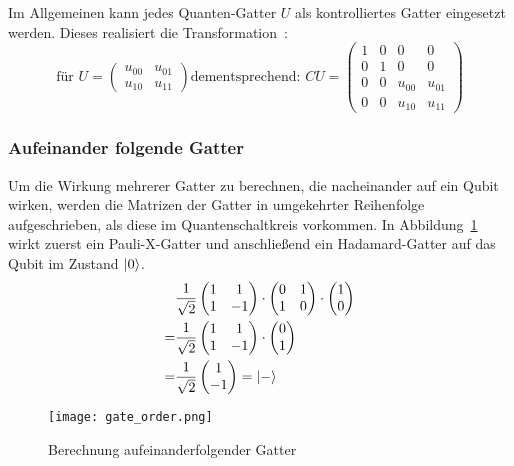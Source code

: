 Im Allgemeinen kann jedes Quanten-Gatter \(U\) als kontrolliertes Gatter eingesetzt werden. 
Dieses realisiert die Transformation~\cite{Hoever2023QC}: 
\[
  \text{für }
  U = 
  \begin{pmatrix}
    u_{00} & u_{01}\\
    u_{10} & u_{11}
    \end{pmatrix}
    \text{dementsprechend: }
    CU = 
  \begin{pmatrix}
    1 & 0 & 0 & 0\\
    0 & 1 & 0 & 0\\
    0 & 0 & u_{00} & u_{01}\\
    0 & 0 & u_{10} & u_{11}
    \end{pmatrix}
  \]


\subsubsection*{Aufeinander folgende Gatter} 

Um die Wirkung mehrerer Gatter zu berechnen, die nacheinander auf ein Qubit wirken, 
werden die Matrizen der Gatter in umgekehrter Reihenfolge aufgeschrieben, 
als diese im Quantenschaltkreis vorkommen. 
In Abbildung~\ref{fig:gate_order} wirkt zuerst ein Pauli-X-Gatter und anschließend ein Hadamard-Gatter auf das Qubit im Zustand \(\ket{0}\).
\begin{align*}
  &\frac{1}{\sqrt{2}}
  \begin{pmatrix}
    1 & 1 \\
    1 & -1
  \end{pmatrix} 
  \cdot
  \begin{pmatrix}
    0 & 1 \\
    1 & 0
    \end{pmatrix} 
  \cdot
  \begin{pmatrix}
    1  \\
    0 
  \end{pmatrix}  \\
  =&
  \frac{1}{\sqrt{2}}
  \begin{pmatrix}
    1 & 1 \\
    1 & -1
    \end{pmatrix} 
  \cdot
  \begin{pmatrix}
    0  \\
    1 
  \end{pmatrix} \\
  =&
  \frac{1}{\sqrt{2}}
  \begin{pmatrix}
    1  \\
    -1 
  \end{pmatrix}
  =
  \ket{-}
  \end{align*}
\begin{figure}[H]
  \centering
  \texttt{[image: gate\_order.png]}
  \caption{Berechnung aufeinanderfolgender Gatter}
  \label{fig:gate_order}
\end{figure}

